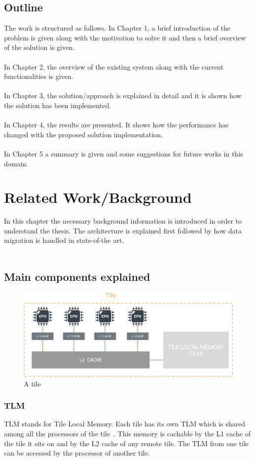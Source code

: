 \documentclass{listhesis}
\begin{document}
\section{Outline}
The work is structured as follows. In Chapter 1, a brief introduction of the problem is given along with the motivation to solve it and then a brief overview of the solution is given.\\
\\
In Chapter 2, the overview of the existing system along with the current functionalities is given.\\
\\
In Chapter 3, the solution/approach is explained in detail and it is shown how the solution has been implemented. \\
\\
In Chapter 4, the results are presented. It shows how the performance has changed with the proposed solution implementation. \\
\\
In Chapter 5 a summary is given and some suggestions for future works in this domain. 
\chapter{Related Work/Background}
In this chapter the necessary background information is introduced in order to understand the thesis. The architecture is explained first followed by how data migration is handled in state-of-the art.\\
\\
\section{Main components explained}
\begin{figure}
  \includegraphics[width=\linewidth]{tile.png}
  \centering
  \caption{A tile}
  \label{fig:tile}
\end{figure}
\subsection{TLM}
TLM stands for Tile Local Memory. Each tile has its own TLM which is shared among all the processors of the tile~\cite{ankitThesis}. This memory is cachable by the L1 cache of the tile it sits on and by the L2 cache of any remote tile. The TLM from one tile can be accessed by the processor of another tile.\\
\end{document}
